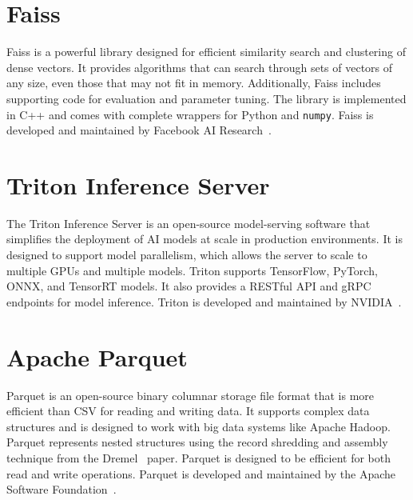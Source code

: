 \section{Faiss}
Faiss is a powerful library designed for efficient similarity search and clustering of dense vectors. It provides algorithms that can search through sets of vectors of any size, even those that may not fit in memory. Additionally, Faiss includes supporting code for evaluation and parameter tuning. The library is implemented in C++ and comes with complete wrappers for Python and \texttt{numpy}. Faiss is developed and maintained by Facebook AI Research~\cite{Faiss}.

\section{Triton Inference Server}
The Triton Inference Server is an open-source model-serving software that simplifies the deployment of AI models at scale in production environments. It is designed to support model parallelism, which allows the server to scale to multiple GPUs and multiple models. Triton supports TensorFlow, PyTorch, ONNX, and TensorRT models. It also provides a RESTful API and gRPC endpoints for model inference. Triton is developed and maintained by NVIDIA~\cite{TritonInferenceServer}.

\section{Apache Parquet}
Parquet is an open-source binary columnar storage file format that is more efficient than CSV for reading and writing data. It supports complex data structures and is designed to work with big data systems like Apache Hadoop.
Parquet represents nested structures using the record shredding and assembly technique from the Dremel~\cite{Dremel} paper.
Parquet is designed to be efficient for both read and write operations. 
Parquet is developed and maintained by the Apache Software Foundation~\cite{ApacheParquet}. 